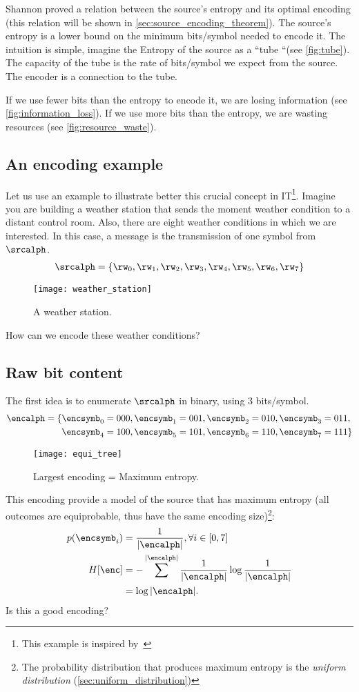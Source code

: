 Shannon proved a relation between the source's entropy and its optimal encoding (this relation will be shown in \cref{sec:source_encoding_theorem}). The source's entropy is a lower bound on the minimum bits/symbol needed to encode it. The intuition is simple, imagine the Entropy of the source as a ``tube ``(see \cref{fig:tube}). The capacity of the tube is the rate of bits/symbol we expect from the source. The encoder is a connection to the tube.

If we use fewer bits than the entropy to encode it, we are losing information (see \cref{fig:information_loss}). If we use more bits than the entropy, we are wasting resources (see \cref{fig:resource_waste}).
\subsection{An encoding example}
Let us use an example to illustrate better this crucial concept in \ac{IT}\footnote{This example is inspired by~\citeauthor{geron:2018}}. Imagine you are building a weather station that sends the moment weather condition to a distant control room. Also, there are eight weather conditions in which we are interested. In this case, a message is the transmission of one symbol from \(\srcalph\).
\begin{align}
	\srcalph = \{\rw_0, \rw_1, \rw_2, \rw_3, \rw_4, \rw_5, \rw_6, \rw_7\}
\end{align}
\begin{figure}
	[hbt!] \centering
	\texttt{[image: weather\_station]}
	\caption{A weather station.}\label{fig:weather_station} \end{figure}
How can we encode these weather conditions?

\subsection{Raw bit content} The first idea is to enumerate \(\srcalph\) in binary, using 3 bits/symbol.
\begin{align}
	\encalph = \{&\encsymb_0=000, \encsymb_1=001, \encsymb_2=010, \encsymb_3=011, \nonumber \\
	&\encsymb_4=100, \encsymb_5=101, \encsymb_6=110, \encsymb_7=111\} \label{example_encoding}
\end{align}
\begin{figure}
	[ht!] \centering
	\texttt{[image: equi\_tree]}
	\caption{Largest encoding = Maximum entropy.}\label{fig:equi_tree} \end{figure}
This encoding provide a model of the source that has maximum entropy (all outcomes are equiprobable, thus have the same encoding size)\footnote{The probability distribution that produces maximum entropy is the \emph{uniform distribution} (\cref{sec:uniform_distribution})}:
\begin{align}
	p(\encsymb_i)&=\frac{1}{|\encalph|}, \forall i \in [0,7]\\
	H[\enc]&= - \sum^{|\encalph|}\frac{1}{|\encalph|} \log \frac{1}{|\encalph|}\\
	&= \log |\encalph|.
\end{align}
Is this a good encoding?


